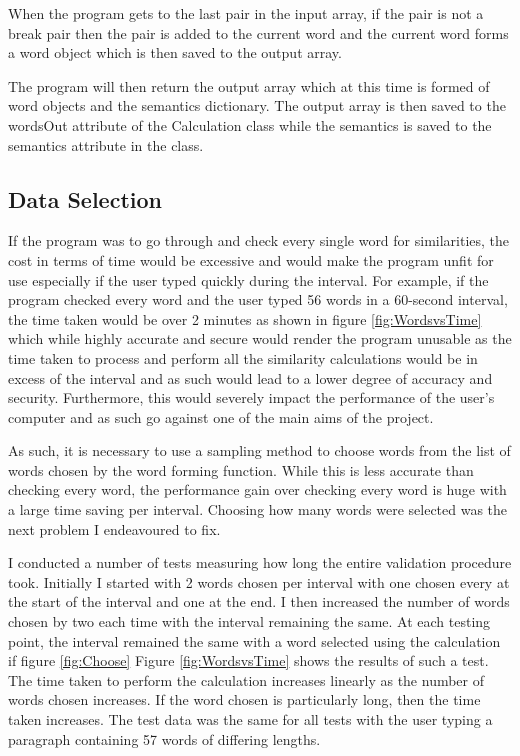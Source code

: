 \documentclass[10pt,a4paper]{report}
\begin{document}
When the program gets to the last pair in the input array, if the pair is not a break pair then the pair is added to the current word and the current word forms a word object which is then saved to the output array.

The program will then return the output array which at this time is formed of word objects and the semantics dictionary. The output array is then saved to the wordsOut attribute of the Calculation class while the semantics is saved to the semantics attribute in the class.

\subsection{Data Selection}

If the program was to go through and check every single word for similarities, the cost in terms of time would be excessive and would make the program unfit for use especially if the user typed quickly during the interval. For example, if the program checked every word and the user typed 56 words in a 60-second interval, the time taken would be over 2 minutes as shown in figure \ref{fig:WordsvsTime} which while highly accurate and secure would render the program unusable as the time taken to process and perform all the similarity calculations would be in excess of the interval and as such would lead to a lower degree of accuracy and security. Furthermore, this would severely impact the performance of the user's computer and as such go against one of the main aims of the project.

As such, it is necessary to use a sampling method to choose words from the list of words chosen by the word forming function. While this is less accurate than checking every word, the performance gain over checking every word is huge with a large time saving per interval. Choosing how many words were selected was the next problem I endeavoured to fix.

I conducted a number of tests measuring how long the entire validation procedure took. Initially I started with 2 words chosen per interval with one chosen every at the start of the interval and one at the end. I then increased the number of words chosen by two each time with the interval remaining the same. At each testing point, the interval remained the same with a word selected using the calculation if figure \ref{fig:Choose} Figure \ref{fig:WordsvsTime} shows the results of such a test. The time taken to perform the calculation increases linearly as the number of words chosen increases. If the word chosen is particularly long, then the time taken increases. The test data was the same for all tests with the user typing a paragraph containing 57 words of differing lengths.
\end{document}
